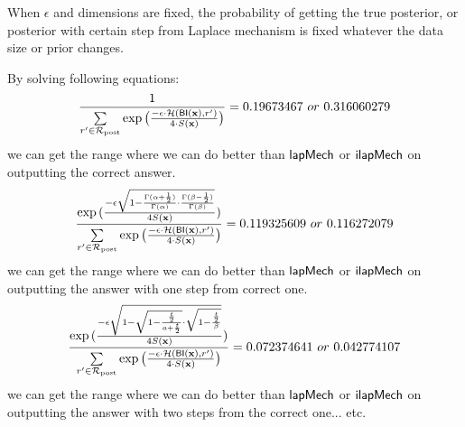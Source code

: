 \documentclass{article}
\begin{document}

When $\epsilon$ and dimensions are fixed, the probability of getting the true posterior, or posterior with certain step from Laplace mechanism is fixed whatever the data size or prior changes.

By solving following equations:
  \[
  \frac{1}{\nomalizer{\dataobs}} = 0.19673467\ or\ 0.316060279
  \]
  we can get the range where we can do better than $\mathsf{lapMech}$ or $\mathsf{ilapMech}$ on outputting the correct answer. 
  \[
  \frac{\exp{(\frac{- \epsilon \sqrt{1 - \frac{\Gamma(\alpha+\frac{1}{2})}{\Gamma(\alpha)} \cdot
   \frac{\Gamma(\beta - \frac{1}{2})}{\Gamma(\beta)}}}{4 S(\textbf{x})})}}{\sum\limits_{r'\in \mathcal{R}_{\textup{post}}} \exp \big(\frac{-\epsilon\cdot \mathcal{H} (\mathsf{BI}(\textbf{x}),r')}{4 \cdot S(\textbf{x})}\big)}
   = 0.119325609\ or\ 0.116272079
  \]
  we can get the range where we can do better than $\mathsf{lapMech}$ or $\mathsf{ilapMech}$ on outputting the answer with one step from correct one.
  \[
\frac{\exp{(\frac{- \epsilon \sqrt{1 - 
    \sqrt{1 - \frac{\frac{t}{2}}{a + \frac{t}{2}}}
    \cdot
    \sqrt{1 - \frac{\frac{t}{2}}{\beta}}}}
    {4 S(\textbf{x})})}}{\sum\limits_{r'\in \mathcal{R}_{\textup{post}}} \exp \big(\frac{-\epsilon\cdot \mathcal{H} (\mathsf{BI}(\textbf{x}),r')}{4 \cdot S(\textbf{x})}\big)}
     = 0.072374641\ or\ 0.042774107
\]
we can get the range where we can do better than $\mathsf{lapMech}$ or $\mathsf{ilapMech}$ on outputting the answer with two steps from the correct one... etc.
\end{document}
